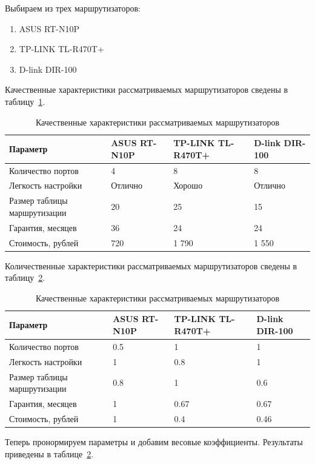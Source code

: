 \documentclass[russian,utf8,emptystyle]{eskdtext}
\begin{document}
Выбираем из трех маршрутизаторов:
\begin{enumerate}[label=\arabic*.]
\item ASUS RT-N10P
\item TP-LINK TL-R470T+
\item D-link DIR-100
\end{enumerate}

Качественные характеристики рассматриваемых маршрутизаторов сведены в таблицу~\ref{tab:routers-1}.

\begin{longtable}{p{7cm}|p{2cm}|p{2cm}|p{2cm}}
\caption{Качественные характеристики рассматриваемых маршрутизаторов}
\label{tab:routers-1} \\
Параметр                     & ASUS RT-N10P & TP-LINK TL-R470T+ & D-link DIR-100 \\ 
\hline 
Количество портов            & 4         & 8      & 8  \\ 
Легкость настройки           & Отлично   & Хорошо & Отлично  \\ 
Размер таблицы маршрутизации & 20        & 25     & 15  \\ 
Гарантия, месяцев            & 36        & 24     & 24  \\ 
Стоимость, рублей            & 720       & 1 790  & 1 550 \\
\end{longtable}

Количественные характеристики рассматриваемых маршрутизаторов сведены в таблицу~\ref{tab:routers-2}.

\begin{longtable}{p{7cm}|p{2cm}|p{2cm}|p{2cm}}
\caption{Качественные характеристики рассматриваемых маршрутизаторов}
\label{tab:routers-2} \\
Параметр                     & ASUS RT-N10P & TP-LINK TL-R470T+ & D-link DIR-100 \\ 
\hline 
Количество портов            & 0.5       & 1      & 1  \\ 
Легкость настройки           & 1         & 0.8    & 1  \\ 
Размер таблицы маршрутизации & 0.8       & 1      & 0.6  \\ 
Гарантия, месяцев            & 1         & 0.67   & 0.67  \\ 
Стоимость, рублей            & 1         & 0.4    & 0.46 \\
\end{longtable}

Теперь пронормируем параметры и добавим весовые коэффициенты. Результаты приведены в таблице~\ref{tab:routers-2}.
\end{document}
